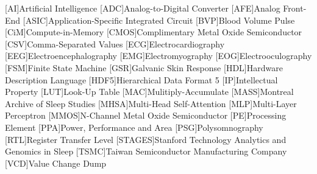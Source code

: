 \begin{acronym}
    {\small{}
    [AI]{Artificial Intelligence}
    [ADC]{Analog-to-Digital Converter}
    [AFE]{Analog Front-End}
    [ASIC]{Application-Specific Integrated Circuit}
    [BVP]{Blood Volume Pulse}
    [CiM]{Compute-in-Memory}
    [CMOS]{Complimentary Metal Oxide Semiconductor}
    [CSV]{Comma-Separated Values}
    [ECG]{Electrocardiography}
    [EEG]{Electroencephalography}
    [EMG]{Electromyography}
    [EOG]{Electrooculography}
    [FSM]{Finite State Machine}
    [GSR]{Galvanic Skin Response}
    [HDL]{Hardware Description Language}
    [HDF5]{Hierarchical Data Format 5}
    [IP]{Intellectual Property}
    [LUT]{Look-Up Table}
    [MAC]{Mulitiply-Accumulate}
    [MASS]{Montreal Archive of Sleep Studies}
    [MHSA]{Multi-Head Self-Attention}
    [MLP]{Multi-Layer Perceptron}
    [MMOS]{N-Channel Metal Oxide Semiconductor}
    [PE]{Processing Element}
    [PPA]{Power, Performance and Area}
    [PSG]{Polysomnography}
    [RTL]{Register Transfer Level}
    [STAGES]{Stanford Technology Analytics and Genomics in Sleep}
    [TSMC]{Taiwan Semiconductor Manufacturing Company}
    [VCD]{Value Change Dump}
    }
\end{acronym}